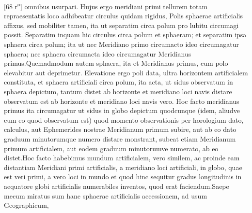 [68 r\textsuperscript{o}] omnibus  usurpari. Hujus ergo meridiani\protect{} primi tellurem totam repraesentatis loco adhibeatur  circulus quidam rigidus, Polis\protect{} sphaerae artificialis affixus, sed mobiliter tamen, ita ut separatim  circa polum pro lubitu circumagi possit.  Separatim inquam hic circulus circa polum\protect{}  et sphaeram; et separatim ipsa sphaera circa polum\protect{}; ita ut nec Meridiano\protect{} primo circumacto ideo circumagatur sphaera; nec sphaera  circumacta ideo circumagatur Meridianus\protect{}  primus.\pend \pstart Quemadmodum autem sphaera, ita et Meridianus\protect{} primus, cum polo\protect{} elevabitur aut deprimetur. Elevatione ergo poli\protect{} data, ultra horizontem artificialem constituta, et sphaera artificiali circa polum, ita acta, ut sidus observatum in sphaera depictum, tantum distet ab horizonte et meridiano\protect{} loci navis\protect{}  distare observatum est ab horizonte et meridiano\protect{} loci navis\protect{} vero. Hoc  facto meridianus\protect{} primus ita circumagatur ut sidus\protect{} in globo depictum quodcunque (idem,  aliudve cum eo quod observatum est) quod momento observationis per horologium\protect{} dato, calculus, aut Ephemerides\protect{} nostrae Meridianum\protect{} primum subire, aut ab eo dato graduum minutorumque numero distare monstrant, subeat etiam Meridianum\protect{} primum artificialem, aut eodem graduum minutorumve  numerato, ab eo distet.\pend \pstart Hoc facto  habebimus mundum artificialem, vero similem, ac proinde eam distantiam Meridiani\protect{} primi  artificialis, a meridiano\protect{} loci artificiali, in globo, quae est veri primi, a vero loci in mundo et  quod hinc sequitur gradus longitudinis\protect{} in aequatore\protect{} globi artificialis numerabiles inventos, quod erat faciendum.\pend \pstart Saepe mecum miratus sum hanc sphaerae artificialis accessionem, ad usum Geographicum,